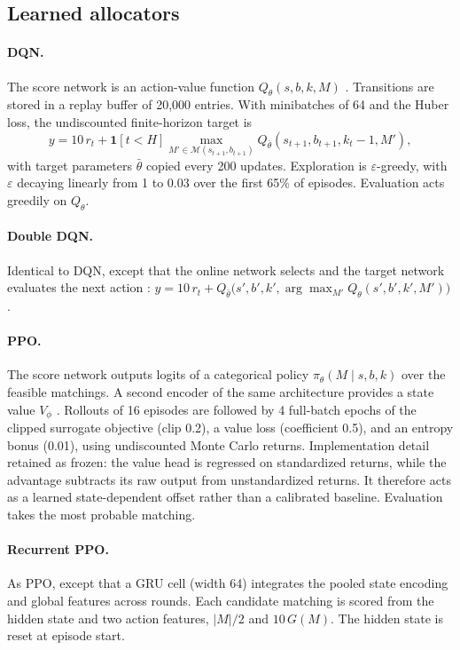 \documentclass[11pt,a4paper]{article}
\newcommand{\M}{\mathcal{M}}
\begin{document}
\subsection{Learned allocators}\label{sec:learners}

\paragraph{DQN.} The score network is an action-value function $Q_\theta(s,b,k,M)$ \cite{mnih2015human}. Transitions are stored in a replay buffer of 20{,}000 entries. With minibatches of 64 and the Huber loss, the undiscounted finite-horizon target is
\begin{equation}
  y = 10\,r_t + \mathbf{1}[t<H]\max_{M'\in\M(s_{t+1},b_{t+1})} Q_{\bar\theta}(s_{t+1},b_{t+1},k_t-1,M'),
\end{equation}
with target parameters $\bar\theta$ copied every 200 updates. Exploration is $\varepsilon$-greedy, with $\varepsilon$ decaying linearly from 1 to 0.03 over the first 65\% of episodes. Evaluation acts greedily on $Q_\theta$.

\paragraph{Double DQN.} Identical to DQN, except that the online network selects and the target network evaluates the next action \cite{vanhasselt2016deep}: $y=10\,r_t+Q_{\bar\theta}\bigl(s',b',k',\arg\max_{M'}Q_\theta(s',b',k',M')\bigr)$.

\paragraph{PPO.} The score network outputs logits of a categorical policy $\pi_\theta(M\mid s,b,k)$ over the feasible matchings. A second encoder of the same architecture provides a state value $V_\phi$ \cite{schulman2017proximal}. Rollouts of 16 episodes are followed by 4 full-batch epochs of the clipped surrogate objective (clip 0.2), a value loss (coefficient 0.5), and an entropy bonus (0.01), using undiscounted Monte Carlo returns. Implementation detail retained as frozen: the value head is regressed on standardized returns, while the advantage subtracts its raw output from unstandardized returns. It therefore acts as a learned state-dependent offset rather than a calibrated baseline. Evaluation takes the most probable matching.

\paragraph{Recurrent PPO.} As PPO, except that a GRU cell \cite{cho2014learning} (width 64) integrates the pooled state encoding and global features across rounds. Each candidate matching is scored from the hidden state and two action features, $|M|/2$ and $10\,G(M)$. The hidden state is reset at episode start.
\end{document}
